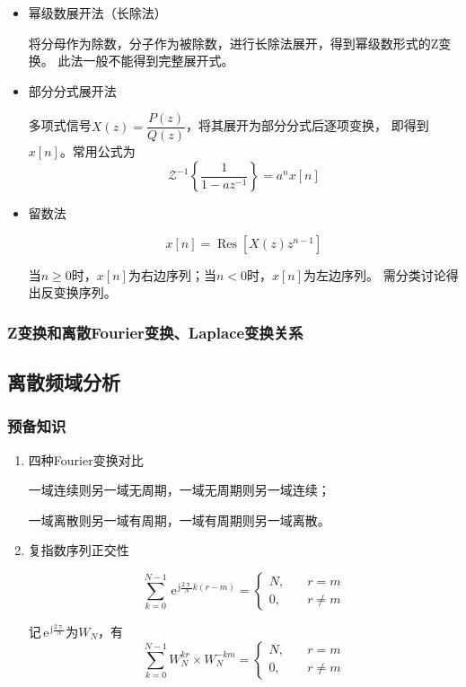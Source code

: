 \documentclass[UTF8,fontset=fandol,zihao=5]{ctexart}
\newcommand{\jj}{\,\mathrm{j}}
\newcommand{\ee}{\,\mathrm{e}}
\newcommand{\zf}{\mathcal{Z}}
\newcommand{\Res}{\operatorname{Res}}
\begin{document}
\begin{methodbox}[【题型】求Z反变换]
  \begin{itemize}
    \item 幂级数展开法（长除法）
    
    将分母作为除数，分子作为被除数，进行长除法展开，得到幂级数形式的Z变换。
    此法一般不能得到完整展开式。
    
    \item 部分分式展开法

    多项式信号$X(z)=\dfrac{P(z)}{Q(z)}$，将其展开为部分分式后逐项变换，
    即得到$x[n]$。常用公式为
    \[
    \zf^{-1}\left\{\frac{1}{1-az^{-1}}\right\}=a^n x[n]
    \]

    \item 留数法
    
    \[
    x[n]=\Res\left[X(z)z^{n-1}\right]
    \]

    当$n\geq 0$时，$x[n]$为右边序列；当$n<0$时，$x[n]$为左边序列。
    需分类讨论得出反变换序列。

  \end{itemize}
\end{methodbox}

\subsubsection{Z变换和离散Fourier变换、Laplace变换关系}

\subsection{离散频域分析}

\subsubsection{预备知识}

\begin{enumerate}
  \item 四种Fourier变换对比
  
  \begin{methodbox}[Fourier变换连续性与周期性关系]
    一域连续则另一域无周期，一域无周期则另一域连续；

    一域离散则另一域有周期，一域有周期则另一域离散。
  \end{methodbox}
  
  \item 复指数序列正交性
  
  \[
  \sum_{k=0}^{N-1}\ee^{\jj\frac{2\uppi}{N}k(r-m)}=
  \left\{\begin{aligned}
    N, \quad &r = m \\
    0, \quad &r \neq m
  \end{aligned}\right.
  \]

  记$\ee^{\jj\frac{2\uppi}{N}}$为$W_N$，有
  \[
  \sum_{k=0}^{N-1}W_N^{kr}\times W_N^{-km}=
  \left\{\begin{aligned}
    N, \quad &r = m \\
    0, \quad &r \neq m
  \end{aligned}\right.
  \]
\end{enumerate}
\end{document}

